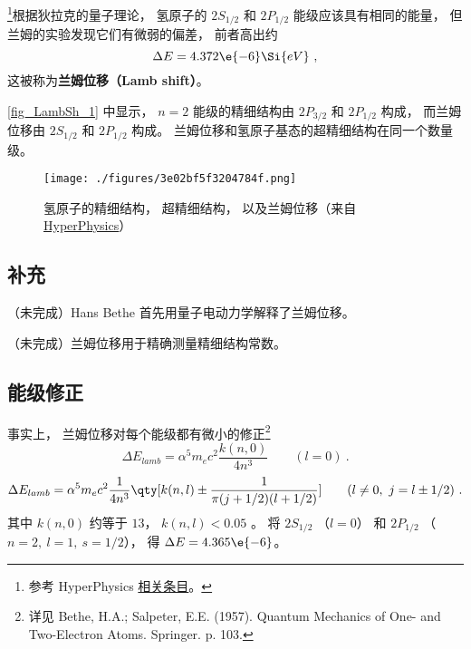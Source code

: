 
\begin{issues}
\issueDraft
\issueMissDepend
\end{issues}


\footnote{参考 HyperPhysics \href{http://hyperphysics.phy-astr.gsu.edu/hbase/quantum/lamb.html}{相关条目}。}根据狄拉克的量子理论， 氢原子的 $2S_{1/2}$ 和 $2P_{1/2}$ 能级应该具有相同的能量， 但兰姆的实验发现它们有微弱的偏差， 前者高出约
\begin{equation}
\Delta E = 4.372\e{-6} \Si{eV}~,
\end{equation}
这被称为\textbf{兰姆位移（Lamb shift）}。

\autoref{fig_LambSh_1} 中显示， $n=2$ 能级的精细结构由 $2P_{3/2}$ 和 $2P_{1/2}$ 构成， 而兰姆位移由 $2S_{1/2}$ 和 $2P_{1/2}$ 构成。 兰姆位移和氢原子基态的超精细结构在同一个数量级。 
\begin{figure}[ht]
\centering
\texttt{[image: ./figures/3e02bf5f3204784f.png]}
\caption{氢原子的精细结构， 超精细结构， 以及兰姆位移（来自 \href{http://hyperphysics.phy-astr.gsu.edu/hbase/quantum/lamb.html}{HyperPhysics}）} \label{fig_LambSh_1}
\end{figure} %

\subsection{补充}
（未完成）Hans Bethe 首先用量子电动力学解释了兰姆位移。

（未完成）兰姆位移用于精确测量精细结构常数。

\subsection{能级修正}
事实上， 兰姆位移对每个能级都有微小的修正\footnote{详见 Bethe, H.A.; Salpeter, E.E. (1957). Quantum Mechanics of One- and Two-Electron Atoms. Springer. p. 103.}
\begin{equation}
\Delta E_{lamb} = \alpha^5 m_e c^2 \frac{k(n, 0)}{4n^3} \qquad (l = 0)~.
\end{equation}
\begin{equation}
\Delta E_{lamb} =\alpha^5 m_e c^2 \frac{1}{4n^3} \qty[k(n,l) \pm \frac{1}{\pi(j+1/2)(l+1/2)} ] \qquad (l \ne 0,\ j = l \pm 1/2)~.
\end{equation}
其中 $k(n, 0)$ 约等于 $13$， $k(n, l) < 0.05$ 。 将 $2S_{1/2}$ （$l = 0$） 和 $2P_{1/2}$ （$n = 2,\ l = 1,\ s = 1/2$）， 得 $\Delta E = 4.365\e{-6}$。
